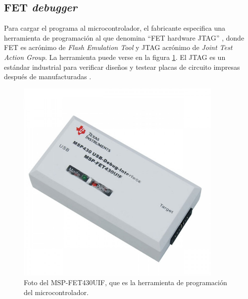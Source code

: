 \subsection{FET \textit{debugger}}


Para cargar el programa al microcontrolador, el fabricante especifica una herramienta de programación al que denomina \textquotedblleft FET hardware JTAG\textquotedblright \cite{FETjtag} , donde FET es acrónimo de \textit{Flash Emulation Tool} y JTAG acrónimo de \textit{Joint Test Action Group}. La herramienta puede verse en la figura \ref{fig:mspFETtool}. El JTAG es un estándar industrial para verificar diseños y testear placas de circuito impresas después de manufacturadas \cite{JTAGintel}. 


\begin{figure}[!h]
	\centering
	\includegraphics[width=100mm,keepaspectratio]{Figures/emeesepeFET.jpg}
	\caption{ Foto del MSP-FET430UIF, que es la herramienta de programación del microcontrolador.}
	\label{fig:mspFETtool}
\end{figure}

